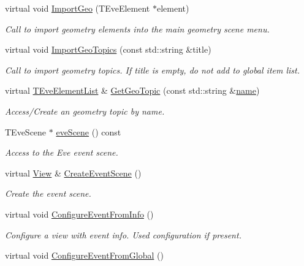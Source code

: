 \begin{DoxyCompactItemize}
virtual void \hyperlink{class_d_d4hep_1_1_view_aa316fb1bb5375d1e57ba534a510919a7}{Import\+Geo} (T\+Eve\+Element $\ast$element)
\begin{DoxyCompactList}\small\item\em Call to import geometry elements into the main geometry scene menu. \end{DoxyCompactList}\item 
virtual void \hyperlink{class_d_d4hep_1_1_view_abd144de401f8a410789c497f44161330}{Import\+Geo\+Topics} (const std\+::string \&title)
\begin{DoxyCompactList}\small\item\em Call to import geometry topics. If title is empty, do not add to global item list. \end{DoxyCompactList}\item 
virtual \hyperlink{class_t_eve_element_list}{T\+Eve\+Element\+List} \& \hyperlink{class_d_d4hep_1_1_view_a20af6b4597b0e51880186bc138bfe28e}{Get\+Geo\+Topic} (const std\+::string \&\hyperlink{class_d_d4hep_1_1_view_ae369eadf16399a6bf34f1ce491b7a788}{name})
\begin{DoxyCompactList}\small\item\em Access/\+Create an geometry topic by name. \end{DoxyCompactList}\item 
T\+Eve\+Scene $\ast$ \hyperlink{class_d_d4hep_1_1_view_aeef39a82e524cc30b1bec56f97071312}{eve\+Scene} () const
\begin{DoxyCompactList}\small\item\em Access to the Eve event scene. \end{DoxyCompactList}\item 
virtual \hyperlink{class_d_d4hep_1_1_view}{View} \& \hyperlink{class_d_d4hep_1_1_view_a405104d10cef9018701601ae5346d89d}{Create\+Event\+Scene} ()
\begin{DoxyCompactList}\small\item\em Create the event scene. \end{DoxyCompactList}\item 
virtual void \hyperlink{class_d_d4hep_1_1_view_a1c4ddbce48cb4e389a8d515a4644773b}{Configure\+Event\+From\+Info} ()
\begin{DoxyCompactList}\small\item\em Configure a view with event info. Used configuration if present. \end{DoxyCompactList}\item 
virtual void \hyperlink{class_d_d4hep_1_1_view_a70d3dfc35cf31c58c5d6e1d1385d1b56}{Configure\+Event\+From\+Global} ()

\end{DoxyCompactItemize}
